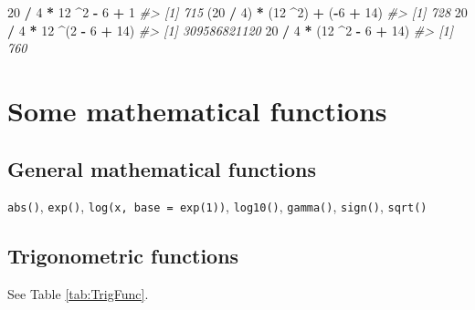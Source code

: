 \documentclass[
]{book}
\newenvironment{Shaded}{\begin{snugshade}}{\end{snugshade}}
\newcommand{\CommentTok}[1]{\textcolor[rgb]{0.56,0.35,0.01}{\textit{#1}}}
\newcommand{\DecValTok}[1]{\textcolor[rgb]{0.00,0.00,0.81}{#1}}
\newcommand{\NormalTok}[1]{#1}
\newcommand{\SpecialCharTok}[1]{\textcolor[rgb]{0.81,0.36,0.00}{\textbf{#1}}}
\begin{document}
\begin{Shaded}
\begin{Highlighting}[]
\DecValTok{20} \SpecialCharTok{/} \DecValTok{4} \SpecialCharTok{*} \DecValTok{12} \SpecialCharTok{\^{}}\DecValTok{2} \SpecialCharTok{{-}} \DecValTok{6} \SpecialCharTok{+} \DecValTok{1}
\CommentTok{\#\textgreater{} [1] 715}
\NormalTok{(}\DecValTok{20} \SpecialCharTok{/} \DecValTok{4}\NormalTok{) }\SpecialCharTok{*}\NormalTok{ (}\DecValTok{12} \SpecialCharTok{\^{}}\DecValTok{2}\NormalTok{) }\SpecialCharTok{+}\NormalTok{ (}\SpecialCharTok{{-}}\DecValTok{6} \SpecialCharTok{+} \DecValTok{14}\NormalTok{)}
\CommentTok{\#\textgreater{} [1] 728}
\DecValTok{20} \SpecialCharTok{/} \DecValTok{4} \SpecialCharTok{*} \DecValTok{12} \SpecialCharTok{\^{}}\NormalTok{(}\DecValTok{2} \SpecialCharTok{{-}} \DecValTok{6} \SpecialCharTok{+} \DecValTok{14}\NormalTok{)}
\CommentTok{\#\textgreater{} [1] 309586821120}
\DecValTok{20} \SpecialCharTok{/} \DecValTok{4} \SpecialCharTok{*}\NormalTok{ (}\DecValTok{12} \SpecialCharTok{\^{}}\DecValTok{2} \SpecialCharTok{{-}} \DecValTok{6} \SpecialCharTok{+} \DecValTok{14}\NormalTok{)}
\CommentTok{\#\textgreater{} [1] 760}
\end{Highlighting}
\end{Shaded}

\section{Some mathematical functions}\label{some-mathematical-functions}

\subsection{General mathematical functions}\label{general-mathematical-functions}

\texttt{abs()}, \texttt{exp()}, \texttt{log(x,\ base\ =\ exp(1))}, \texttt{log10()}, \texttt{gamma()}, \texttt{sign()}, \texttt{sqrt()}

\subsection{Trigonometric functions}\label{trigonometric-functions}

See Table \ref{tab:TrigFunc}.
\end{document}

